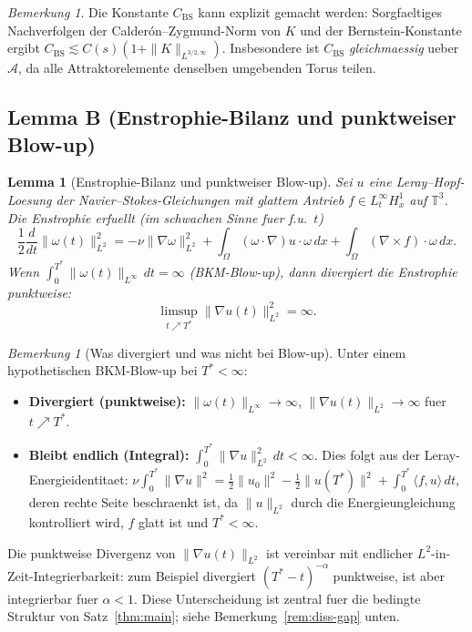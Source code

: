 \documentclass[12pt,a4paper]{article}
\theoremstyle{definition}
\theoremstyle{plain}
\newtheorem{lemma}[definition]{Lemma}
\theoremstyle{remark}
\newtheorem{remark}[definition]{Bemerkung}
\begin{document}
\begin{remark}
Die Konstante $C_{\mathrm{BS}}$ kann explizit gemacht werden: Sorgfaeltiges Nachverfolgen der
Calder\'{o}n--Zygmund-Norm von $K$ und der Bernstein-Konstante ergibt
$C_{\mathrm{BS}} \lesssim C(s)(1 + \|K\|_{L^{3/2,\infty}})$. Insbesondere
ist $C_{\mathrm{BS}}$ \emph{gleichmaessig} ueber $\mathcal{A}$, da alle Attraktorelemente
denselben umgebenden Torus teilen.
\end{remark}

\subsection*{Lemma B (Enstrophie-Bilanz und punktweiser Blow-up)}
\begin{lemma}[Enstrophie-Bilanz und punktweiser Blow-up]
\label{lem:enstrophy}
Sei $u$ eine Leray--Hopf-Loesung der Navier--Stokes-Gleichungen mit glattem
Antrieb $f \in L^\infty_t H^1_x$ auf $\mathbb{T}^3$. Die Enstrophie erfuellt (im
schwachen Sinne fuer f.u.\ $t$)
\begin{equation}\label{eq:enstrophy}
    \frac{1}{2}\frac{d}{dt}\|\omega(t)\|_{L^2}^2
    = -\nu\|\nabla\omega\|_{L^2}^2
      + \int_\Omega (\omega\cdot\nabla)u\cdot\omega\,dx
      + \int_\Omega (\nabla\times f)\cdot\omega\,dx.
\end{equation}
Wenn $\int_0^{T^*}\|\omega(t)\|_{L^\infty}\,dt = \infty$ (BKM-Blow-up), dann
divergiert die Enstrophie punktweise:
\begin{equation}\label{eq:diss-blowup}
    \limsup_{t \nearrow T^*}\|\nabla u(t)\|_{L^2}^2 = \infty.
\end{equation}
\end{lemma}

\begin{remark}[Was divergiert und was nicht bei Blow-up]
\label{rem:divergence-landscape}
Unter einem hypothetischen BKM-Blow-up bei $T^* < \infty$:
\begin{itemize}
  \item \textbf{Divergiert (punktweise):}\;
    $\|\omega(t)\|_{L^\infty} \to \infty$,\;
    $\|\nabla u(t)\|_{L^2} \to \infty$ fuer $t \nearrow T^*$.
  \item \textbf{Bleibt endlich (Integral):}\;
    $\int_0^{T^*}\|\nabla u\|_{L^2}^2\,dt < \infty$.
    Dies folgt aus der Leray-Energieidentitaet:
    $\nu\int_0^{T^*}\|\nabla u\|^2
    = \tfrac{1}{2}\|u_0\|^2 - \tfrac{1}{2}\|u(T^*)\|^2
    + \int_0^{T^*}\langle f,u\rangle\,dt$,
    deren rechte Seite beschraenkt ist, da $\|u\|_{L^2}$ durch die
    Energieungleichung kontrolliert wird, $f$ glatt ist und $T^* < \infty$.
\end{itemize}
Die punktweise Divergenz von $\|\nabla u(t)\|_{L^2}$ ist vereinbar mit
endlicher $L^2$-in-Zeit-Integrierbarkeit: zum Beispiel divergiert
$(T^*-t)^{-\alpha}$ punktweise, ist aber integrierbar fuer $\alpha < 1$.
Diese Unterscheidung ist zentral fuer die bedingte Struktur von
Satz~\ref{thm:main}; siehe Bemerkung~\ref{rem:diss-gap} unten.
\end{remark}
\end{document}
